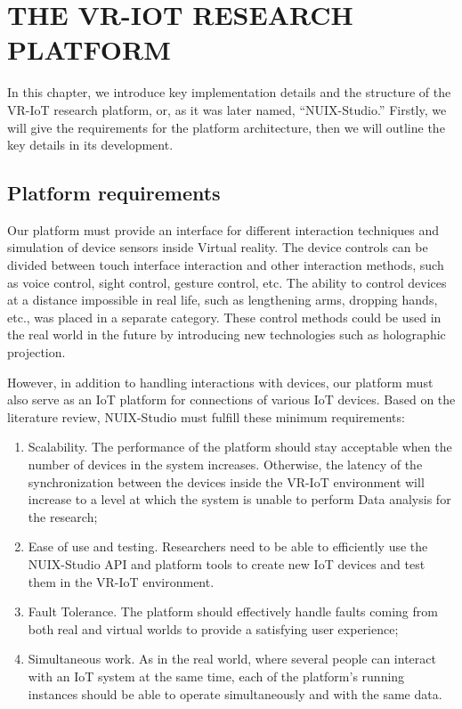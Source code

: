 
\chapter{\MakeUppercase{The VR-IoT Research Platform}}

In this chapter, we introduce key implementation details and the structure of the VR-IoT research platform, or, as it was later named, ``NUIX-Studio.'' Firstly, we will give the requirements for the platform architecture, then we will outline the key details in its development.

\section{Platform requirements}

Our platform must provide an interface for different interaction techniques and simulation of device sensors inside Virtual reality. The device controls can be divided between touch interface interaction and other interaction methods, such as voice control, sight control, gesture control, etc. The ability to control devices at a distance impossible in real life, such as lengthening arms, dropping hands, etc., was placed in a separate category. These control methods could be used in the real world in the future by introducing new technologies such as holographic projection. 

However, in addition to handling interactions with devices, our platform must also serve as an IoT platform for connections of various IoT devices. Based on the literature review, NUIX-Studio must fulfill these minimum requirements:
\begin{enumerate}
\item Scalability. The performance of the platform should stay acceptable when the number of devices in the system increases. Otherwise, the latency of the synchronization between the devices inside the VR-IoT environment will increase to a level at which the system is unable to perform Data analysis for the research;
\item Ease of use and testing. Researchers need to be able to efficiently use the NUIX-Studio API and platform tools to create new IoT devices and test them in the VR-IoT environment.
\item Fault Tolerance. The platform should effectively handle faults coming from both real and virtual worlds to provide a satisfying user experience;
\item Simultaneous work. As in the real world, where several people can interact with an IoT system at the same time, each of the platform's running instances should be able to operate simultaneously and with the same data.
\end{enumerate}

